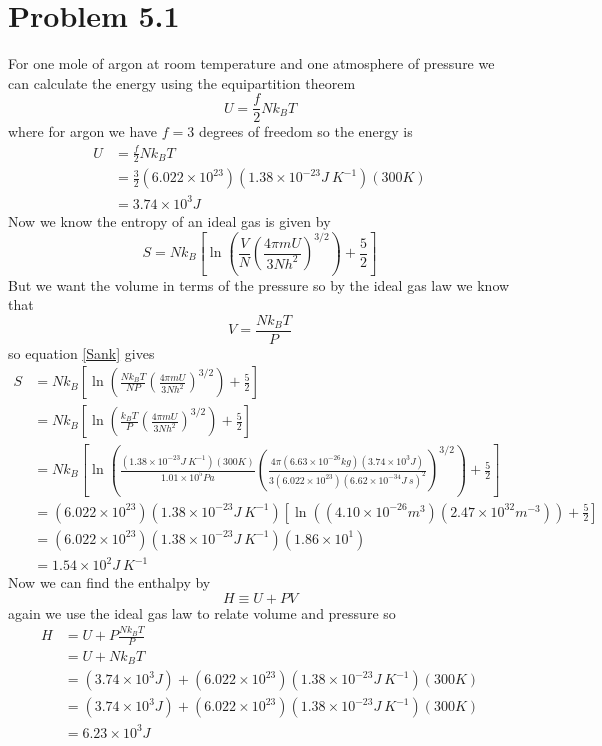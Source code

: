 \documentclass[11pt]{article}
\numberwithin{equation}{section}
\begin{document}


\section{Problem 5.1}
For one mole of argon at room temperature and one atmosphere of pressure we can calculate the energy using the equipartition theorem 
\begin{equation}
U = \frac{f}{2}Nk_BT 
\label{equipart}
\end{equation}
where for argon we have $f=3$ degrees of freedom so the energy is
\begin{align*}
U &= \frac{f}{2}Nk_BT \\
&= \frac{3}{2}(6.022\times10^{23})(1.38\times10^{-23}\unit{J\ K^{-1}})(300\unit{K}) \\
&= 3.74\times10^{3}\unit{J}
\end{align*}
Now we know the entropy of an ideal gas is given by
\begin{equation}
S = Nk_B\left[\ln\left(\frac{V}{N}\left(\frac{4\pi mU}{3Nh^2}\right)^{3/2}\right)+\frac{5}{2}\right]
\label{Sank}
\end{equation}
But we want the volume in terms of the pressure so by the ideal gas law we know that
$$V = \frac{Nk_BT}{P}$$
so equation \ref{Sank} gives
\begin{align*}
S &= Nk_B\left[\ln\left(\frac{Nk_BT}{NP}\left(\frac{4\pi mU}{3Nh^2}\right)^{3/2}\right)+\frac{5}{2}\right]\\
&= Nk_B\left[\ln\left(\frac{k_BT}{P}\left(\frac{4\pi mU}{3Nh^2}\right)^{3/2}\right)+\frac{5}{2}\right]\\
&= Nk_B\left[\ln\left(\frac{(1.38\times10^{-23}\unit{J\ K^{-1}})(300\unit{K})}{1.01\times10^{5}\unit{Pa}}\left(\frac{4\pi (6.63\times10^{-26}\unit{kg})(3.74\times10^{3}\unit{J})}{3(6.022\times10^{23})(6.62\times10^{-34}\unit{J\ s})^2}\right)^{3/2}\right)+\frac{5}{2}\right]\\
&= (6.022\times10^{23})(1.38\times10^{-23}\unit{J\ K^{-1}})\left[\ln\left((4.10\times10^{-26}\unit{m^3})(2.47\times10^{32}\unit{m^{-3}})\right)+\frac{5}{2}\right]\\
&= (6.022\times10^{23})(1.38\times10^{-23}\unit{J\ K^{-1}})(1.86\times10^{1})\\
&= 1.54\times10^{2}\unit{J\ K^{-1}}
\end{align*}
Now we can find the enthalpy by
$$H \equiv U + PV$$
again we use the ideal gas law to relate volume and pressure so
\begin{align*}
H &= U + P\frac{Nk_BT}{P}\\
&= U + Nk_BT\\
&= (3.74\times10^{3}\unit{J}) + (6.022\times10^{23})(1.38\times10^{-23}\unit{J\ K^{-1}})(300\unit{K})\\
&= (3.74\times10^{3}\unit{J}) + (6.022\times10^{23})(1.38\times10^{-23}\unit{J\ K^{-1}})(300\unit{K})\\
&= 6.23\times10^{3}\unit{J}
\end{align*}
\end{document}
